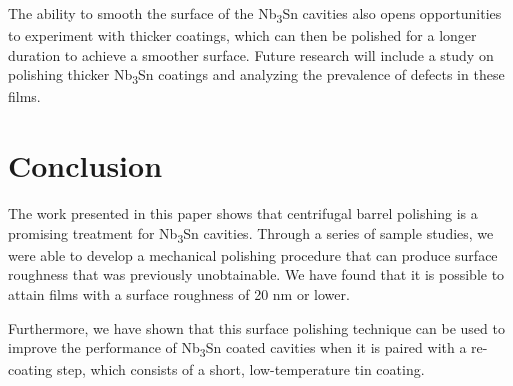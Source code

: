 \documentclass[reprint,amsmath,amssymb,aps]{revtex4-2}%
\begin{document}
The ability to smooth the surface of the Nb\textsubscript{3}Sn cavities also opens opportunities to experiment with thicker coatings, which can then be polished for a longer duration to achieve a smoother surface. Future research will include a study on polishing thicker Nb\textsubscript{3}Sn coatings and analyzing the prevalence of defects in these films.

%
\section{Conclusion}%
\label{sec:Conclusion}%
The work presented in this paper shows that centrifugal barrel polishing is a promising treatment for Nb\textsubscript{3}Sn cavities. Through a series of sample studies, we were able to develop a mechanical polishing procedure that can produce surface roughness that was previously unobtainable. We have found that it is possible to attain films with a surface roughness of 20 nm or lower. 

Furthermore, we have shown that this surface polishing technique can be used to improve the performance of Nb\textsubscript{3}Sn coated cavities when it is paired with a re-coating step, which consists of a short, low-temperature tin coating.

%
%
\end{document}
